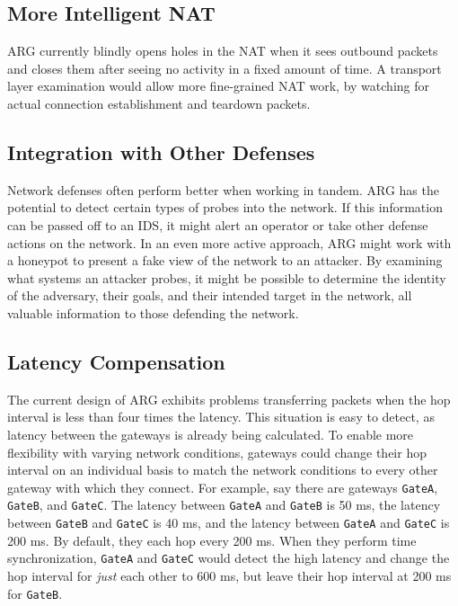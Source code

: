 
\subsection{More Intelligent NAT}
\par \ac{ARG} currently blindly opens holes in the \ac{NAT} when it sees outbound packets and closes them after seeing no activity in a fixed amount of time. A transport layer examination would allow more fine-grained \ac{NAT} work, by watching for actual connection establishment and teardown packets. 

\subsection{Integration with Other Defenses}
\par Network defenses often perform better when working in tandem. \ac{ARG} has the potential to detect certain types of probes into the network. If this information can be passed off to an \ac{IDS}, it might alert an operator or take other defense actions on the network. In an even more active approach, \ac{ARG} might work with a honeypot to present a fake view of the network to an attacker. By examining what systems an attacker probes, it might be possible to determine the identity of the adversary, their goals, and their intended target in the network, all valuable information to those defending the network.

\subsection{Latency Compensation}
\par The current design of \ac{ARG} exhibits problems transferring packets when the hop interval is less than four times the latency. This situation is easy to detect, as latency between the gateways is already being calculated. To enable more flexibility with varying network conditions, gateways could change their hop interval on an individual basis to match the network conditions to every other gateway with which they connect. For example, say there are gateways \texttt{GateA}, \texttt{GateB}, and \texttt{GateC}. The latency between \texttt{GateA} and \texttt{GateB} is 50 ms, the latency between \texttt{GateB} and \texttt{GateC} is 40 ms, and the latency between \texttt{GateA} and \texttt{GateC} is 200 ms. By default, they each hop every 200 ms. When they perform time synchronization, \texttt{GateA} and \texttt{GateC} would detect the high latency and change the hop interval for \textit{just} each other to 600 ms, but leave their hop interval at 200 ms for \texttt{GateB}. 

